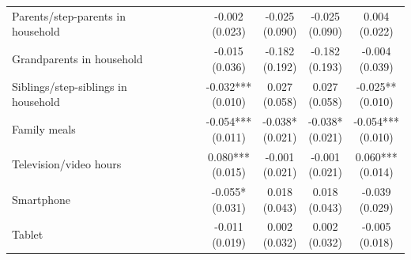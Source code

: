 \begin{table}[!htbp]
\begin{tabular}{p{}cccccc}
\\
Parents/step-parents in household &  &  & \shortstack[c]{-0.002 \\[-0.35ex] (0.023)} & \shortstack[c]{-0.025 \\[-0.35ex] (0.090)} & \shortstack[c]{-0.025 \\[-0.35ex] (0.090)} & \shortstack[c]{0.004 \\[-0.35ex] (0.022)}
\\
Grandparents in household &  &  & \shortstack[c]{-0.015 \\[-0.35ex] (0.036)} & \shortstack[c]{-0.182 \\[-0.35ex] (0.192)} & \shortstack[c]{-0.182 \\[-0.35ex] (0.193)} & \shortstack[c]{-0.004 \\[-0.35ex] (0.039)}
\\
Siblings/step-siblings in household &  &  & \shortstack[c]{-0.032*** \\[-0.35ex] (0.010)} & \shortstack[c]{0.027 \\[-0.35ex] (0.058)} & \shortstack[c]{0.027 \\[-0.35ex] (0.058)} & \shortstack[c]{-0.025** \\[-0.35ex] (0.010)}
\\
Family meals &  &  & \shortstack[c]{-0.054*** \\[-0.35ex] (0.011)} & \shortstack[c]{-0.038* \\[-0.35ex] (0.021)} & \shortstack[c]{-0.038* \\[-0.35ex] (0.021)} & \shortstack[c]{-0.054*** \\[-0.35ex] (0.010)}
\\
Television/video hours &  &  & \shortstack[c]{0.080*** \\[-0.35ex] (0.015)} & \shortstack[c]{-0.001 \\[-0.35ex] (0.021)} & \shortstack[c]{-0.001 \\[-0.35ex] (0.021)} & \shortstack[c]{0.060*** \\[-0.35ex] (0.014)}
\\
Smartphone &  &  & \shortstack[c]{-0.055* \\[-0.35ex] (0.031)} & \shortstack[c]{0.018 \\[-0.35ex] (0.043)} & \shortstack[c]{0.018 \\[-0.35ex] (0.043)} & \shortstack[c]{-0.039 \\[-0.35ex] (0.029)}
\\
Tablet &  &  & \shortstack[c]{-0.011 \\[-0.35ex] (0.019)} & \shortstack[c]{0.002 \\[-0.35ex] (0.032)} & \shortstack[c]{0.002 \\[-0.35ex] (0.032)} & \shortstack[c]{-0.005 \\[-0.35ex] (0.018)}

\end{tabular}
\end{table}
